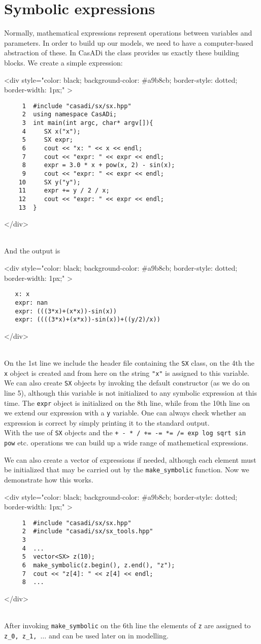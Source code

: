 \documentclass[a4paper,12pt]{book}
\newcommand{\codebegin}{
\begin{rawhtml}
<div style="color: black; background-color: \#a9b8cb;  border-style: dotted; border-width: 1px;" >
\end{rawhtml}
}
\newcommand{\codeend}{
\begin{rawhtml}
</div>
\end{rawhtml}
}
\begin{document}
{\section{Symbolic expressions}
Normally, mathematical expressions represent operations between variables and parameters.
In order to build up our models, we need to have a computer-based abstraction of these. In CasADi
the \texttt{} class provides us exactly these building blocks. We create a simple expression:
\par
\codebegin
\begin{verbatim}
     1  #include "casadi/sx/sx.hpp"
     2  using namespace CasADi;
     3  int main(int argc, char* argv[]){
     4     SX x("x");
     5     SX expr;
     6     cout << "x: " << x << endl;
     7     cout << "expr: " << expr << endl;
     8     expr = 3.0 * x + pow(x, 2) - sin(x);
     9     cout << "expr: " << expr << endl;
    10     SX y("y");
    11     expr += y / 2 / x;
    12     cout << "expr: " << expr << endl;
    13  }
\end{verbatim}
\codeend\\
And the output is
\par
\codebegin
\begin{verbatim}
   x: x
   expr: nan
   expr: (((3*x)+(x*x))-sin(x))
   expr: ((((3*x)+(x*x))-sin(x))+((y/2)/x))
\end{verbatim}
\codeend\\
On the 1st line we include the header file containing the \texttt{SX} class, on the 4th the \texttt{x} object
is created and from here on the string \texttt{"x"} is assigned to this variable. We can also create 
\texttt{SX} objects by invoking the default constructor (as we do on line 5), although this variable is not initialized to any symbolic
expression at this time. The \texttt{expr} object is initialized on the 8th line, while from the 10th line on we extend our expression
with a \texttt{y} variable. One can always check whether an expression is correct by simply printing it to the standard output.\\
With the use of \texttt{SX} objects and the \texttt{+ - * / += -= *= /= exp log sqrt sin pow} etc. operations we can build up a
wide range of mathemetical expressions.
\par
We can also create a vector of expressions if needed, although each element must be initialized that may be
carried out by the \texttt{make\_symbolic} function. Now we demonstrate how this works.
\par
\codebegin
\begin{verbatim}
     1  #include "casadi/sx/sx.hpp"
     2  #include "casadi/sx/sx_tools.hpp"
     3  
     4  ...
     5  vector<SX> z(10);
     6  make_symbolic(z.begin(), z.end(), "z");
     7  cout << "z[4]: " << z[4] << endl;
     8  ...
\end{verbatim}
\codeend\\
After invoking \texttt{make\_symbolic} on the 6th line the elements of \texttt{z} are assigned to \texttt{z\_0, z\_1, $\dots$} and can be used later on in modelling.
}
\end{document}
